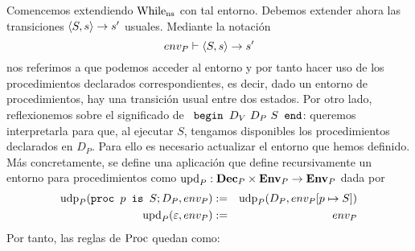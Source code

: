 Comencemos extendiendo $\mathrm{While}_{\mathrm{ns}}$ con tal entorno. Debemos extender ahora las transiciones $\langle S, s \rangle\rightarrow s'$ usuales. Mediante la notación
$$env_P \vdash \langle S, s \rangle\to s'$$
nos referimos a que podemos acceder al entorno y por tanto hacer uso de los procedimientos declarados correspondientes, es decir, dado un entorno de procedimientos, hay una transición usual entre dos estados. Por otro lado, reflexionemos sobre el significado de $\texttt{ begin }D_V\ D_P\ S\texttt{ end}$: queremos interpretarla para que, al ejecutar $S$, tengamos disponibles los procedimientos declarados en $D_P$. Para ello es necesario actualizar el entorno que hemos definido. Más concretamente, se define una aplicación que define recursivamente un entorno para procedimientos como $\mathrm{upd}_P: \textbf{Dec}_P \times \mathbf{Env}_P \rightarrow \mathbf{Env}_P$ dada por
\begin{eqnarray*}
    \mathrm{udp}_P(\texttt{proc }p\texttt{ is }S;D_P, env_P) &:=& \mathrm{udp}_P(D_P, env_P[p\mapsto S])\\
    \mathrm{upd}_P(\varepsilon, env_P) &:=& env_P\\
\end{eqnarray*}
Por tanto, las reglas de $\mathrm{Proc}$ quedan como:
